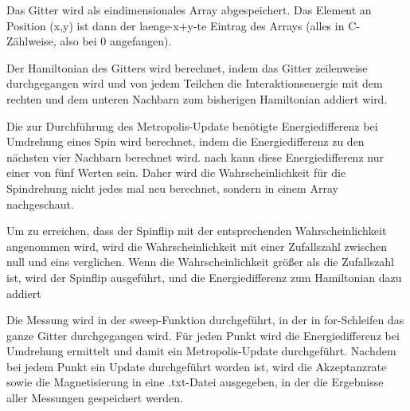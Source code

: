 \documentclass{scrreprt}
\begin{document}
	
	Das Gitter wird als eindimensionales Array abgespeichert. Das Element an Position (x,y) ist dann der laenge$\cdot$x+y-te Eintrag des Arrays (alles in C-Zählweise, also bei 0 angefangen).

	Der Hamiltonian des Gitters wird berechnet, indem das Gitter zeilenweise durchgegangen wird und von jedem Teilchen die Interaktionsenergie mit dem rechten und dem unteren Nachbarn zum bisherigen Hamiltonian addiert wird.
	
	Die zur Durchführung des Metropolis-Update benötigte Energiedifferenz bei Umdrehung eines Spin wird berechnet, indem die Energiedifferenz zu den nächsten vier Nachbarn berechnet wird. 
	nach \cite[S. 103]{binderheermann} kann diese Energiedifferenz nur einer von fünf Werten sein. Daher wird die Wahrscheinlichkeit für die Spindrehung nicht jedes mal neu berechnet, sondern in einem Array nachgeschaut.
	
	Um zu erreichen, dass der Spinflip mit der entsprechenden Wahrscheinlichkeit angenommen wird, wird die Wahrscheinlichkeit mit einer Zufallszahl zwischen null und eins verglichen\cite[nach][]{metropolisupdate}. Wenn die Wahrscheinlichkeit größer als die Zufallszahl ist, wird der Spinflip ausgeführt, und die Energiedifferenz zum Hamiltonian dazu addiert
	
	Die Messung wird in der sweep-Funktion durchgeführt, in der in for-Schleifen das ganze Gitter durchgegangen wird. Für jeden Punkt wird die Energiedifferenz bei Umdrehung ermittelt und damit ein Metropolis-Update durchgeführt. Nachdem bei jedem Punkt ein Update durchgeführt worden ist, wird die Akzeptanzrate sowie die Magnetisierung in eine .txt-Datei ausgegeben, in der die Ergebnisse aller Messungen gespeichert werden.
	
\end{document}
